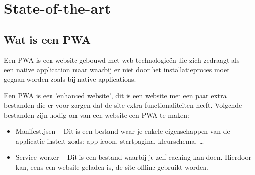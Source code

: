 
\section{State-of-the-art}
\label{sec:state-of-the-art}
\subsection{Wat is een PWA}

Een PWA is een website gebouwd met web technologieën die zich gedraagt als een native application maar waarbij er niet door het installatieproces moet gegaan worden zoals bij native applications.
\autocite{Sayali2018}

Een PWA is een 'enhanced website', dit is een website met een paar extra bestanden die er voor zorgen dat de site extra functionaliteiten heeft. Volgende bestanden zijn nodig om van een website een PWA te maken:
\begin{itemize}
    \item Manifest.json – Dit is een bestand waar je enkele eigenschappen van de applicatie instelt zoals: app icoon, startpagina, kleurschema, …
    \item Service worker – Dit is een bestand waarbij je zelf caching kan doen. Hierdoor kan, eens een website geladen is, de site offline gebruikt worden.
\end{itemize}
\autocite{Harris2017}

